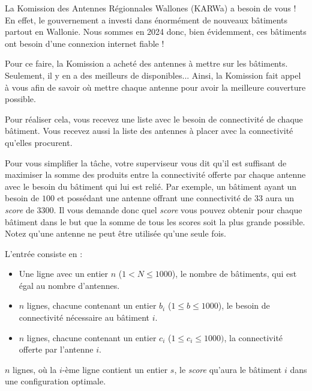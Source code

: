 \problemname{\problemyamlname}


La Komission des Antennes Régionnales Wallones (KARWa) a besoin de vous ! En effet, le gouvernement a investi dans énormément de nouveaux bâtiments partout en Wallonie. Nous sommes en 2024 donc, bien évidemment, ces bâtiments ont besoin d'une connexion internet fiable !

Pour ce faire, la Komission a acheté des antennes à mettre sur les bâtiments. Seulement, il y en a des meilleurs de disponibles... Ainsi, la Komission fait appel à vous afin de savoir où mettre chaque antenne pour avoir la meilleure couverture possible.

Pour réaliser cela, vous recevez une liste avec le besoin de connectivité de chaque bâtiment. Vous recevez aussi la liste des antennes à placer avec la connectivité qu'elles procurent.

Pour vous simplifier la tâche, votre superviseur vous dit qu'il est suffisant de maximiser la somme des produits entre la connectivité offerte par chaque antenne avec le besoin du bâtiment qui lui est relié. Par exemple, un bâtiment ayant un besoin de $100$ et possédant une antenne offrant une connectivité de $33$ aura un \emph{score} de $3300$. Il vous demande donc quel \emph{score} vous pouvez obtenir pour chaque bâtiment dans le but que la somme de tous les scores soit la plus grande possible. Notez qu'une antenne ne peut être utilisée qu'une seule fois.

\begin{Input}
    L'entrée consiste en :
    \begin{itemize}
      \item Une ligne avec un entier $n$ ($1 < N \leq 1000$), le nombre de bâtiments, qui est égal au nombre d'antennes.
      \item $n$ lignes, chacune contenant un entier $b_i$ ($1 \leq b \leq 1000$), le besoin de connectivité nécessaire au bâtiment $i$.
      \item $n$ lignes, chacune contenant un entier $c_i$ ($1 \leq c_i \leq 1000)$, la connectivité offerte par l'antenne $i$.
    \end{itemize}
\end{Input}

\begin{Output}
  $n$ lignes, où la $i$-ème ligne contient un entier $s$, le \emph{score} qu'aura le bâtiment $i$ dans une configuration optimale.
\end{Output}
